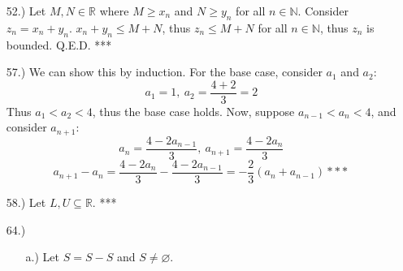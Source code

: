 \documentclass[12pt]{article}
\newcommand{\vertb}[1]{\left\vert#1\right\vert}
\newcommand{\e}{\varepsilon}
\begin{document}
\begin{itemize}



    \item [52.)] Let $M,N\in\mathbb{R}$ where $M\geq x_n$ and $N\geq y_n$ for all $n\in\mathbb{N}$. Consider $z_n=x_n+y_n$. $x_n+y_n\leq M+N$, thus $z_n\leq M+N$ for all $n\in\mathbb{N}$, thus $z_n$ is bounded. Q.E.D. ***

    \item [57.)] We can show this by induction. For the base case, consider $a_1$ and $a_2$:
    \[a_1=1,\ a_2=\frac{4+2}{3}=2\]
    Thus $a_1<a_2<4$, thus the base case holds. Now, suppose $a_{n-1}<a_n<4$, and consider $a_{n+1}$:
    \[a_{n}=\frac{4-2a_{n-1}}{3},\ a_{n+1}=\frac{4-2a_{n}}{3}\]
    \[a_{n+1}-a_n=\frac{4-2a_n}{3}-\frac{4-2a_{n-1}}{3}=-\frac{2}{3}(a_n+a_{n-1})***\]

    \item [58.)] Let $L,U\subseteq\mathbb R$. ***





    \item [64.)] \begin{itemize}
        \item [a.)] Let $S=S-S$ and $S\ne\varnothing$.
    \end{itemize}


\end{itemize}
\end{document}
